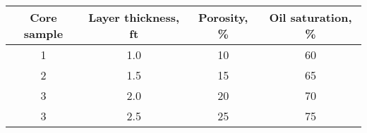\begin{tabular}[12pt]{|c|c|c|c|}
\hline
\textbf{Core sample}&\textbf{Layer thickness, ft}&\textbf{Porosity, \%}&\textbf{Oil saturation, \%}\\
\hline
1&1.0&10&60\\
\hline
2&1.5&15&65\\
\hline
3&2.0&20&70\\
\hline
3&2.5&25&75\\
\hline
\end{tabular}